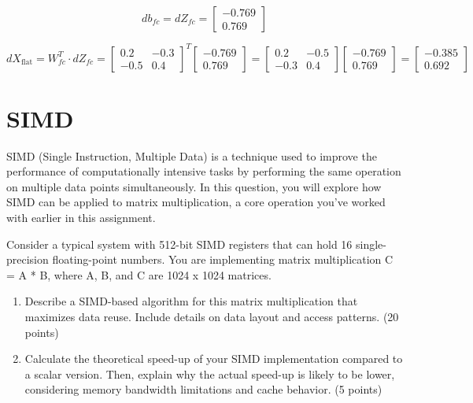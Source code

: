 \documentclass[a4 paper]{article}
\begin{document}
\[
db_{fc} = dZ_{fc} =
\begin{bmatrix}
-0.769 \\ 0.769
\end{bmatrix}
\]

\[
dX_{\text{flat}} = W_{fc}^T \cdot dZ_{fc} =
\begin{bmatrix}
0.2 & -0.3 \\
-0.5 & 0.4
\end{bmatrix}^T
\begin{bmatrix}
-0.769 \\ 0.769
\end{bmatrix}
=
\begin{bmatrix}
0.2 & -0.5 \\
-0.3 & 0.4
\end{bmatrix}
\begin{bmatrix}
-0.769 \\ 0.769
\end{bmatrix}
=
\begin{bmatrix}
-0.385 \\ 0.692
\end{bmatrix}
\]


\newpage
\section{SIMD}
\label{sec:simd}

SIMD (Single Instruction, Multiple Data) is a technique used to improve the performance of computationally intensive tasks by performing the same operation on multiple data points simultaneously. In this question, you will explore how SIMD can be applied to matrix multiplication, a core operation you've worked with earlier in this assignment.


Consider a typical system with 512-bit SIMD registers that can hold 16 single-precision floating-point numbers. You are implementing matrix multiplication C = A * B, where A, B, and C are 1024 x 1024 matrices.

\begin{enumerate}
    \item  Describe a SIMD-based algorithm for this matrix multiplication that maximizes data reuse. Include details on data layout and access patterns. (20 points)
    \item  Calculate the theoretical speed-up of your SIMD implementation compared to a scalar version. Then, explain why the actual speed-up is likely to be lower, considering memory bandwidth limitations and cache behavior. (5 points)
\end{enumerate}
\end{document}
